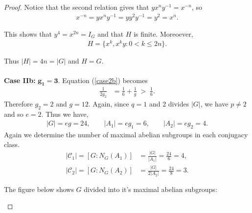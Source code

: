 \documentclass[a4paper , 11pt]{book}
\theoremstyle{definition}
\theoremstyle{remark}
\begin{document}
\begin{proof}
Notice that the second relation gives that $y x^n y^{-1} = x^{-n}$, so
\begin{align*} x^{-n} = y x^n y^{-1} = y y^2 y^{-1} = y^2 = x^n.
\end{align*}

This shows that $y^4 = x^{2n} = I_G$ and that $H$ is finite. Moreoever,
\begin{align*} H = \{ x^k, x^ky :  0 < k \leq 2n \}.
\end{align*}

 Thus $|H| = 4n = |G|$ and $H = G$. \\
\\
\textbullet \space \textbf{Case IIb:} $\pmb{g_1 = 3}$.  Equation (\ref{case2b}) becomes
\begin{align*} \frac{1}{2g_2} &= \frac{1}{6} + \frac{1}{g} \; > \; \frac{1}{6}.
\end{align*}
Therefore $g_2 = 2$ and $g = 12$. Again, since $q=1$ and 2 divides $|G|$, we have $p \neq 2$ and so $e = 2$. Thus we have,
\begin{align*} |G| = eg = 24, \qquad |A_1| = eg_1 = 6, \qquad |A_2| = eg_2 = 4.
\end{align*}
Again we determine the number of maximal abelian subgroups in each conjugacy class.
\begin{align*}  |\mathcal{C}_1| = [G:N_G(A_1)] &= \frac{|G|}{|A_1|} = \frac{24}{6} = 4, 
\\[1.5ex] |\mathcal{C}_2| = [G:N_G(A_2)] &= \frac{|G|}{2|A_2|} = \frac{24}{8} = 3.
\end{align*}

\newpage
The figure below shows $G$ divided into it's maximal abelian subgroups:
\begin{center}
\end{center}
\end{proof}
\end{document}

